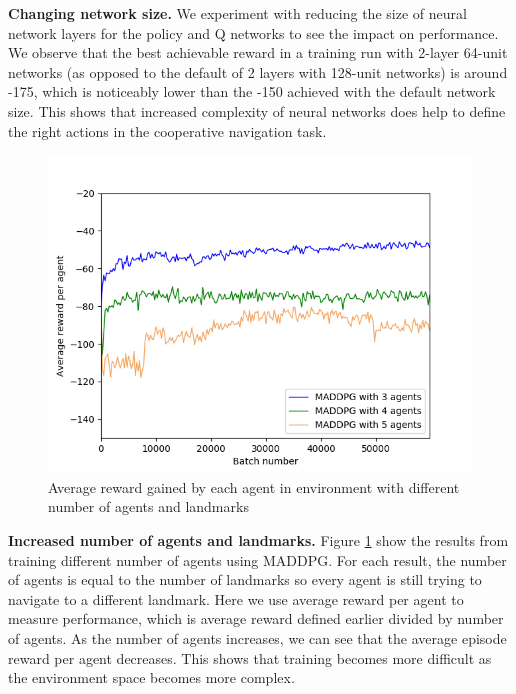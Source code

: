 \documentclass{article}
\begin{document}
\textbf{Changing network size.} We experiment with reducing the size of neural network layers for the policy and Q networks to see the impact on performance. We observe that the best achievable reward in a training run with 2-layer 64-unit networks (as opposed to the default of 2 layers with 128-unit networks) is around -175, which is noticeably lower than the -150 achieved with the default network size. This shows that increased complexity of neural networks does help to define the right actions in the cooperative navigation task. 

\begin{figure}
\begin{center}
\includegraphics[scale=0.45]{maddpg_3,4,5agents.png}
\end{center}
\caption{Average reward gained by each agent in environment with different number of agents and landmarks}
\label{fig:avg_reward_multiple_agents}
\end{figure}

\textbf{Increased number of agents and landmarks.} Figure \ref{fig:avg_reward_multiple_agents} show the results from training different number of agents using MADDPG. For each result, the number of agents is equal to the number of landmarks so every agent is still trying to navigate to a different landmark. Here we use average reward per agent to measure performance, which is average reward defined earlier divided by number of agents. As the number of agents increases, we can see that the average episode reward per agent decreases. This shows that training becomes more difficult as the environment space becomes more complex. 
\end{document}
